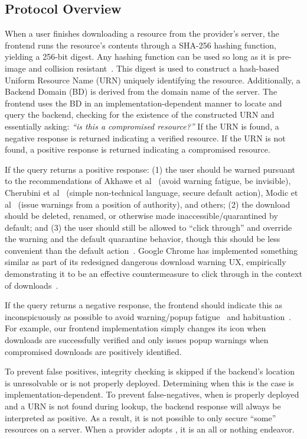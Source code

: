 \subsection{Protocol Overview}

When a user finishes downloading a resource from the provider's server, the
frontend runs the resource's contents through a SHA-256 hashing function,
yielding a 256-bit digest. Any hashing function can be used so long as it is
pre-image and collision resistant~\cite{Rogaway}. This digest is used to
construct a hash-based Uniform Resource Name (URN) uniquely identifying the
resource. Additionally, a Backend Domain (BD) is derived from the domain name of
the server. The frontend uses the BD in an implementation-dependent manner to
locate and query the backend, checking for the existence of the constructed URN
and essentially asking: \emph{``is this a compromised resource?''} If the URN
is found, a negative response is returned indicating a verified resource. If the
URN is not found, a positive response is returned indicating a compromised
resource.

If the query returns a positive response: (1) the user should be warned pursuant
to the recommendations of Akhawe et al~\cite{Akhawe} (avoid warning fatigue, be
invisible), Cherubini et al~\cite{Cherubini} (simple non-technical language,
secure default action), Modic et al~\cite{Modic} (issue warnings from a position
of authority), and others; (2) the download should be deleted, renamed, or
otherwise made inaccessible/quarantined by default; and (3) the user should
still be allowed to ``click through'' and override the warning and the default
quarantine behavior, though this should be less convenient than the default
action~\cite{Cherubini}. Google Chrome has implemented something similar as part
of its redesigned dangerous download warning UX, empirically demonstrating it to
be an effective countermeasure to click through in the context of
downloads~\cite{ChromeClickThrough}.

If the query returns a negative response, the frontend should indicate this as
inconspicuously as possible to avoid warning/popup fatigue~\cite{Akhawe,
Cherubini} and habituation~\cite{Sunshine}. For example, our frontend
implementation simply changes its icon when downloads are successfully verified
and only issues popup warnings when compromised downloads are positively
identified.

To prevent false positives, integrity checking is skipped if the backend's
location is unresolvable or \SYSTEM{} is not properly deployed. Determining when
this is the case is implementation-dependent. To prevent false-negatives, when
\SYSTEM{} is properly deployed and a URN is not found during lookup, the backend
response will always be interpreted as positive. As a result, it is not possible
to only secure ``some'' resources on a server. When a provider adopts \SYSTEM{},
it is an all or nothing endeavor.

